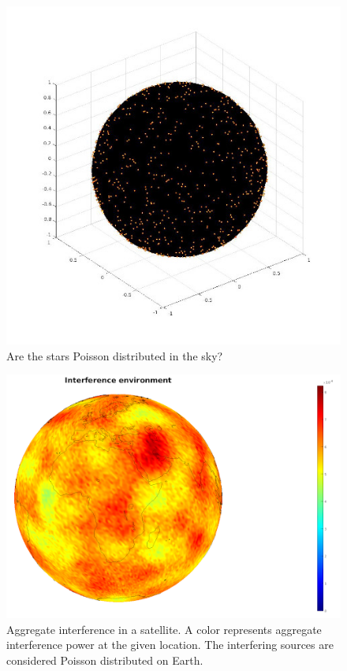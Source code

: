 \documentclass{article}
\begin{document}
\begin{figure}
  \includegraphics[width=\linewidth]{poissononsphere.jpg}
  \caption{Are the stars Poisson distributed in the sky?}
\end{figure}

\begin{figure}
  \includegraphics[width=\linewidth]{interferenceenvironment.png}
  \caption{Aggregate interference in a satellite. A color represents aggregate interference power at the given location. The interfering sources are considered Poisson distributed on Earth.}
\end{figure}
\end{document}
